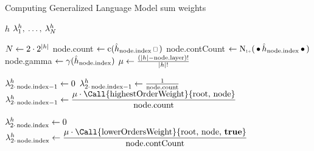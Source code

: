 \begin{algorithm}[t]
  \caption{Computing Generalized Language Model sum weights}
  \label{alg:weightedsum-glm}
  \begin{algorithmic}[1]
    \Require $h$
    \Ensure $\lambda_1^h, \: \ldots, \: \lambda_N^h$

    \State $N \gets 2 \cdot 2^{\left|h\right|}$
      \label{ln:glm-numfactors}
      \label{ln:glm-fornodesingraph}
      \State node.count $\gets \Count(\DerivedHistory[\text{node.index}] \Skp)$
        \label{ln:glm-lookup-count}
      \State node.contCount $\gets \ContCountIp(\WSkp \DerivedHistory[\text{node.index}] \WSkp)$
        \label{ln:glm-lookup-contcount}
      \State node.gamma $\gets \gamma(\DerivedHistory[\text{node.index}])$
        \label{ln:glm-lookup-gamma}
      \State $\mu \gets \frac{({\left|h\right|} - \text{node.layer})!}{{\left|h\right|}!}$
        \label{ln:glm-lookup-coeff}

      \vspace{1.0em}
        \label{ln:glm-if-highweight-zero}
        \State $\lambda_{2 \cdot\, \text{node.index} - 1}^h \gets 0$
          \label{ln:glm-highweight-zero}
        \label{ln:glm-if-highweight-root}
        \State $\lambda_{2 \cdot\, \text{node.index} - 1}^h \gets \frac{1}{\text{node.count}}$
          \label{ln:glm-highweight-frac}
      \Else
        \label{ln:glm-if-highweight-else}
        \State $\SumWeight_{2 \cdot\, \text{node.index} - 1}^h \gets \dfrac{\mu \cdot \text{\Call{highestOrderWeight}{root, node}}}{\text{node.count}}$
          \label{ln:glm-highweight-rec}
      \EndIf

      \vspace{0.7em}
        \label{ln:glm-if-lowweight-zero}
        \State $\lambda_{2 \cdot\, \text{node.index}}^h \gets 0$
          \label{ln:glm-lowweight-zero}
      \Else
        \label{ln:glm-if-lowweight-else}
        \State $\SumWeight_{2 \cdot\, \text{node.index}}^h \gets \dfrac{\mu \cdot \text{\Call{lowerOrdersWeight}{root, node, \textbf{true}}}}{\text{node.contCount}}$
          \label{ln:glm-lowweight-rec}
      \EndIf
    \EndFor
  \end{algorithmic}
\end{algorithm}

